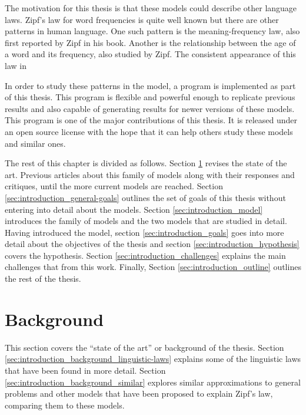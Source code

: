 The motivation for this thesis is that these models could describe other language laws.
Zipf's law for word frequencies is quite well known but there are other patterns in human language.
One such pattern is the meaning-frequency law, also first reported by Zipf in his book. \cite{Zipf1949a}
Another is the relationship between the age of a word and its frequency, also studied by Zipf. \cite{Zipf1949a}
The consistent appearance of this law in 

In order to study these patterns in the model, a \CC{} program is implemented as part of this thesis.
This program is flexible and powerful enough to replicate previous results \cite{Ferrer2003a} \cite{Ferrer2005a} and also capable of generating results for newer versions of these models.
This program is one of the major contributions of this thesis.
It is released under an open source license with the hope that it can help others study these models and similar ones.

The rest of this chapter is divided as follows.
Section \ref{sec:introduction_background} revises the state of the art.
Previous articles about this family of models along with their responses and critiques, until the more current models are reached.
Section \ref{sec:introduction_general-goals} outlines the set of goals of this thesis without entering into detail about the models.
Section \ref{sec:introduction_model} introduces the family of models and the two models that are studied in detail.
Having introduced the model, section \ref{sec:introduction_goals} goes into more detail about the objectives of the thesis and section \ref{sec:introduction_hypothesis} covers the hypothesis.
Section \ref{sec:introduction_challenges} explains the main challenges that from this work.
Finally, Section \ref{sec:introduction_outline} outlines the rest of the thesis.

\section{Background}
\label{sec:introduction_background}

This section covers the ``state of the art'' or background of the thesis.
Section \ref{sec:introduction_background_linguistic-laws} explains some of the linguistic laws that have been found in more detail.
Section \ref{sec:introduction_background_similar} explores similar approximations to general problems and other models that have been proposed to explain Zipf's law, comparing them to these models.

